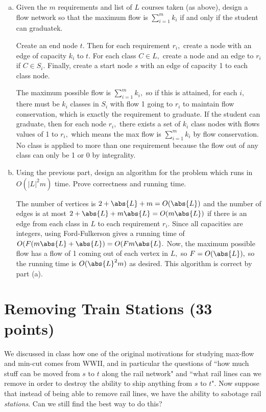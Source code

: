 \documentclass{article}
\begin{document}
\begin{enumerate}[(a)]
	\item Given the $m$ requirements and list of $L$ courses taken (as above), design a flow network so that the maximum flow is $\sum_{i=1}^m k_i$ if and only if the student can graduatek.
		\begin{soln}
			Create an end node $t.$ Then for each requirement $r_i,$ create a node with an edge of capacity $k_i$ to $t.$ For each class $C\in L,$ create a node and an edge to $r_i$ if $C\in S_i.$ Finally, create a start node $s$ with an edge of capacity 1 to each class node.

			The maximum possible flow is $\sum_{i=1}^{m} k_i,$ so if this is attained, for each $i,$ there must be $k_i$ classes in $S_i$ with flow 1 going to $r_i$ to maintain flow conservation, which is exactly the requirement to graduate. If the student can graduate, then for each node $r_i,$ there exists a set of $k_i$ class nodes with flows values of 1 to $r_i,$ which means the max flow is $\sum_{i=1}^{m} k_i$ by flow conservation. No class is applied to more than one requirement because the flow out of any class can only be 1 or 0 by integrality.
		\end{soln}

	\item Using the previous part, design an algorithm for the problem which runs in $O(|L|^2 m)$ time.  Prove correctness and running time.
		\begin{soln}
			The number of vertices is $2+\abs{L}+m=O(\abs{L})$ and the number of edges is at most $2+\abs{L}+m\abs{L}=O(m\abs{L})$ if there is an edge from each class in $L$ to each requirement $r_i.$ Since all capacities are integers, using Ford-Fulkerson gives a running time of $O(F(m\abs{L}+\abs{L}) = O(Fm\abs{L}.$ Now, the maximum possible flow has a flow of 1 coming out of each vertex in $L,$ so $F=O(\abs{L}),$ so the running time is $O(\abs{L}^2m)$ as desired. This algorithm is correct by part (a).
		\end{soln}
\end{enumerate}

\newpage
\section{Removing Train Stations (33 points)}

We discussed in class how one of the original motivations for studying max-flow and min-cut comes from WWII, and in particular the questions of ``how much stuff can be moved from $s$ to $t$ along the rail network" and ``what rail lines can we remove in order to destroy the ability to ship anything from $s$ to $t$".  Now suppose that instead of being able to remove rail lines, we have the ability to sabotage rail \emph{stations}.  Can we still find the best way to do this?
\end{document}
